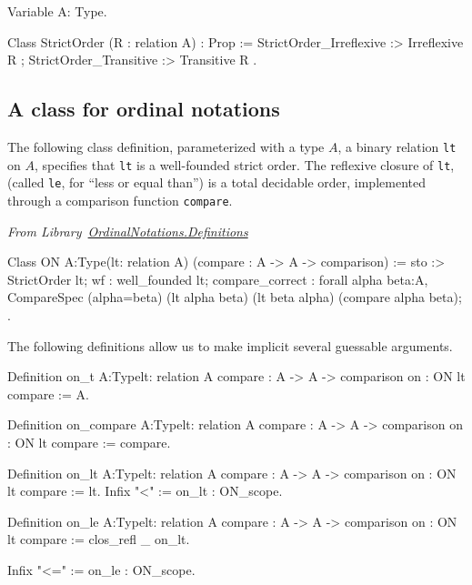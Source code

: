 \begin{Coqsrc}
Variable A: Type.

  Class StrictOrder (R : relation A) : Prop := {
    StrictOrder_Irreflexive :> Irreflexive R ;
    StrictOrder_Transitive :> Transitive R }.
\end{Coqsrc}



\subsection{A class for ordinal notations}

The following class definition, parameterized with a type $A$, a binary relation \texttt{lt} on $A$, specifies that \texttt{lt} is a well-founded strict order. The reflexive closure of \texttt{lt}, (called \texttt{le}, for ``less  or equal than'') is a total decidable order, implemented through a comparison function \texttt{compare}. 

\vspace{4pt}
\noindent\emph{From Library~\href{../src/html/hydras.OrdinalNotations.Definitions.html}{OrdinalNotations.Definitions}}



\begin{Coqsrc}
Class ON {A:Type}(lt: relation A)
      (compare : A -> A -> comparison)  :=
  {
  sto :> StrictOrder lt;
  wf : well_founded lt;
  compare_correct :
    forall alpha beta:A,
      CompareSpec (alpha=beta) (lt alpha beta) (lt beta alpha)
                  (compare alpha beta);
  }.
\end{Coqsrc}

The following definitions allow us to make implicit several guessable arguments.

\begin{Coqsrc}
Definition on_t  {A:Type}{lt: relation A}
            {compare : A -> A -> comparison}
            {on : ON lt compare} := A.

Definition on_compare {A:Type}{lt: relation A}
            {compare : A -> A -> comparison}
            {on : ON lt compare} := compare.

Definition on_lt {A:Type}{lt: relation A}
           {compare : A -> A -> comparison}
           {on : ON lt compare} := lt.
Infix "<" := on_lt : ON_scope.

Definition on_le  {A:Type}{lt: relation A}
           {compare : A -> A -> comparison}
           {on : ON lt compare} :=
  clos_refl _ on_lt.

Infix "<=" := on_le : ON_scope.
\end{Coqsrc}




